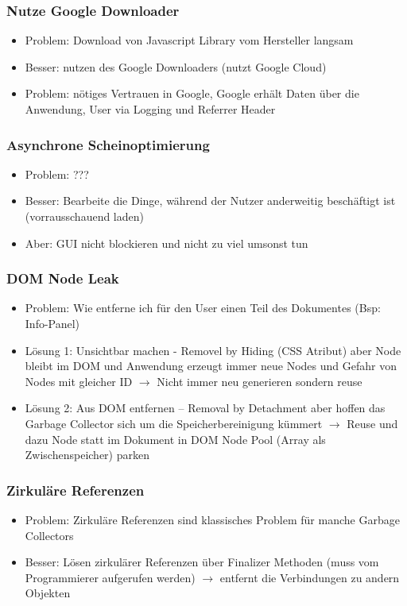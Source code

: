 \documentclass{article} %
\begin{document}
	\subsubsection{Nutze Google Downloader}
	\begin{itemize}
		\item Problem: Download von Javascript Library vom Hersteller langsam
		\item Besser: nutzen des Google Downloaders (nutzt Google Cloud)
		\item Problem: nötiges Vertrauen in Google, Google erhält Daten über die Anwendung, User via Logging und Referrer Header
	\end{itemize}
	\subsubsection{Asynchrone Scheinoptimierung}
	\begin{itemize}
		\item Problem: ???
		\item Besser: Bearbeite die Dinge, während der Nutzer anderweitig beschäftigt ist (vorrausschauend laden)
		\item Aber: GUI nicht blockieren und nicht zu viel umsonst tun
	\end{itemize}
	\subsubsection{DOM Node Leak}
	\begin{itemize}
		\item Problem: Wie entferne ich für den User einen Teil des Dokumentes (Bsp: Info-Panel)
		\item Lösung 1: Unsichtbar machen - Removel by Hiding (CSS Atribut) aber Node bleibt im DOM und Anwendung erzeugt immer neue Nodes und Gefahr von Nodes mit gleicher ID $\rightarrow$ Nicht immer neu generieren sondern reuse
		\item Lösung 2: Aus DOM entfernen – Removal by Detachment aber hoffen das Garbage Collector sich um die Speicherbereinigung kümmert $\rightarrow$ Reuse und dazu Node statt im Dokument in DOM Node Pool (Array als Zwischenspeicher) parken
	\end{itemize}
	\subsubsection{Zirkuläre Referenzen}
	\begin{itemize}
		\item Problem: Zirkuläre Referenzen sind klassisches Problem für manche Garbage Collectors
		\item Besser: Lösen zirkulärer Referenzen über Finalizer Methoden (muss vom Programmierer aufgerufen werden) $\rightarrow$ entfernt die Verbindungen zu andern Objekten
	\end{itemize}
\end{document}
